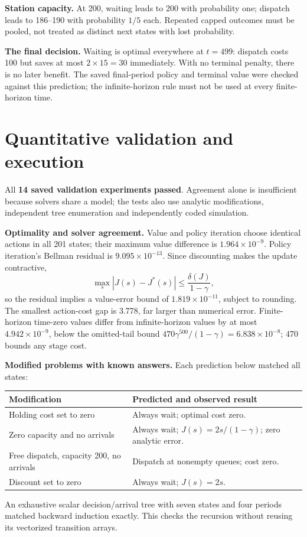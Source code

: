 \documentclass[11pt,letterpaper]{article}
\begin{document}
\textbf{Station capacity.} At 200, waiting leads to 200 with probability one; dispatch leads to 186--190 with probability $1/5$ each. Repeated capped outcomes must be pooled, not treated as distinct next states with lost probability.

\textbf{The final decision.} Waiting is optimal everywhere at $t=499$: dispatch costs 100 but saves at most $2\times15=30$ immediately. With no terminal penalty, there is no later benefit. The saved final-period policy and terminal value were checked against this prediction; the infinite-horizon rule must not be used at every finite-horizon time.

\clearpage
\section{Quantitative validation and execution}\label{sec:validation}
All \textbf{14 saved validation experiments passed}. Agreement alone is insufficient because solvers share a model; the tests also use analytic modifications, independent tree enumeration and independently coded simulation.

\textbf{Optimality and solver agreement.} Value and policy iteration choose identical actions in all 201 states; their maximum value difference is $1.964\times10^{-9}$. Policy iteration's Bellman residual is $9.095\times10^{-13}$. Since discounting makes the update contractive,
\[
\max_s|J(s)-J^*(s)|\leq\frac{\delta(J)}{1-\gamma},
\]
so the residual implies a value-error bound of $1.819\times10^{-11}$, subject to rounding. The smallest action-cost gap is 3.778, far larger than numerical error. Finite-horizon time-zero values differ from infinite-horizon values by at most $4.942\times10^{-9}$, below the omitted-tail bound $470\gamma^{500}/(1-\gamma)=6.838\times10^{-8}$; 470 bounds any stage cost.

\textbf{Modified problems with known answers.} Each prediction below matched all states:
\begin{center}\small
\begin{tabularx}{\linewidth}{@{}p{.37\linewidth}X@{}}\toprule
Modification & Predicted and observed result\\\midrule
Holding cost set to zero & Always wait; optimal cost zero.\\
Zero capacity and no arrivals & Always wait; $J(s)=2s/(1-\gamma)$; zero analytic error.\\
Free dispatch, capacity 200, no arrivals & Dispatch at nonempty queues; cost zero.\\
Discount set to zero & Always wait; $J(s)=2s$.\\\bottomrule
\end{tabularx}\end{center}
An exhaustive scalar decision/arrival tree with seven states and four periods matched backward induction exactly. This checks the recursion without reusing its vectorized transition arrays.
\end{document}
